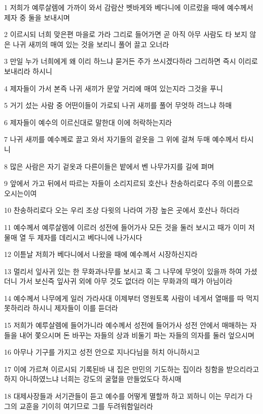 \par 1 저희가 예루살렘에 가까이 와서 감람산 벳바게와 베다니에 이르렀을 때에 예수께서 제자 중 둘을 보내시며
\par 2 이르시되 너희 맞은편 마을로 가라 그리로 들어가면 곧 아직 아무 사람도 타 보지 않은 나귀 새끼의 매여 있는 것을 보리니 풀어 끌고 오너라
\par 3 만일 누가 너희에게 왜 이리 하느냐 묻거든 주가 쓰시겠다하라 그리하면 즉시 이리로 보내리라 하시니
\par 4 제자들이 가서 본즉 나귀 새끼가 문앞 거리에 매여 있는지라 그것을 푸니
\par 5 거기 섰는 사람 중 어떤이들이 가로되 나귀 새끼를 풀어 무엇하 려느냐 하매
\par 6 제자들이 예수의 이르신대로 말한대 이에 허락하는지라
\par 7 나귀 새끼를 예수께로 끌고 와서 자기들의 겉옷을 그 위에 걸쳐 두매 예수께서 타시니
\par 8 많은 사람은 자기 겉옷과 다른이들은 밭에서 벤 나무가지를 길에 펴며
\par 9 앞에서 가고 뒤에서 따르는 자들이 소리지르되 호산나 찬송하리로다 주의 이름으로 오시는이여
\par 10 찬송하리로다 오는 우리 조상 다윗의 나라여 가장 높은 곳에서 호산나 하더라
\par 11 예수께서 예루살렘에 이르러 성전에 들어가사 모든 것을 둘러 보시고 때가 이미 저물매 열 두 제자를 데리시고 베다니에 나가시다
\par 12 이튿날 저희가 베다니에서 나왔을 때에 예수께서 시장하신지라
\par 13 멀리서 잎사귀 있는 한 무화과나무를 보시고 혹 그 나무에 무엇이 있을까 하여 가셨더니 가서 보신즉 잎사귀 외에 아무 것도 없더라 이는 무화과의 때가 아님이라
\par 14 예수께서 나무에게 일러 가라사대 이제부터 영원토록 사람이 네게서 열매를 따 먹지 못하리라 하시니 제자들이 이를 듣더라
\par 15 저희가 예루살렘에 들어가니라 예수께서 성전에 들어가사 성전 안에서 매매하는 자들을 내어 쫓으시며 돈 바꾸는 자들의 상과 비둘기 파는 자들의 의자를 둘러 엎으시며
\par 16 아무나 기구를 가지고 성전 안으로 지나다님을 허치 아니하시고
\par 17 이에 가르쳐 이르시되 기록된바 내 집은 만민의 기도하는 집이라 칭함을 받으리라고 하지 아니하였느냐 너희는 강도의 굴혈을 만들었도다 하시매
\par 18 대제사장들과 서기관들이 듣고 예수를 어떻게 멸할까 하고 꾀하니 이는 무리가 다 그의 교훈을 기이히 여기므로 그를 두려워함일러라
